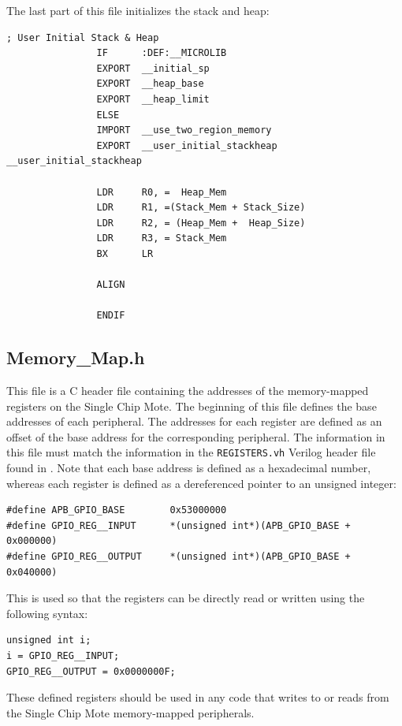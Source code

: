 The last part of this file initializes the stack and heap:

\begin{lstlisting}
; User Initial Stack & Heap
                IF      :DEF:__MICROLIB
                EXPORT  __initial_sp
                EXPORT  __heap_base
                EXPORT  __heap_limit
                ELSE
                IMPORT  __use_two_region_memory
                EXPORT  __user_initial_stackheap
__user_initial_stackheap

                LDR     R0, =  Heap_Mem
                LDR     R1, =(Stack_Mem + Stack_Size)
                LDR     R2, = (Heap_Mem +  Heap_Size)
                LDR     R3, = Stack_Mem
                BX      LR

                ALIGN

                ENDIF
\end{lstlisting}

\subsection{Memory\_Map.h}
This file is a C header file containing the addresses of the memory-mapped registers on the Single Chip Mote. The beginning of this file defines the base addresses of each peripheral. The addresses for each register are defined as an offset of the base address for the corresponding peripheral. The information in this file must match the information in the \texttt{REGISTERS.vh} Verilog header file found in . Note that each base address is defined as a hexadecimal number, whereas each register is defined as a dereferenced pointer to an unsigned integer:

\begin{lstlisting}
#define APB_GPIO_BASE        0x53000000
#define GPIO_REG__INPUT      *(unsigned int*)(APB_GPIO_BASE + 0x000000)
#define GPIO_REG__OUTPUT     *(unsigned int*)(APB_GPIO_BASE + 0x040000)
\end{lstlisting}

This is used so that the registers can be directly read or written using the following syntax:

\begin{lstlisting}
unsigned int i;
i = GPIO_REG__INPUT;
GPIO_REG__OUTPUT = 0x0000000F;
\end{lstlisting}

These defined registers should be used in any code that writes to or reads from the Single Chip Mote memory-mapped peripherals. 

